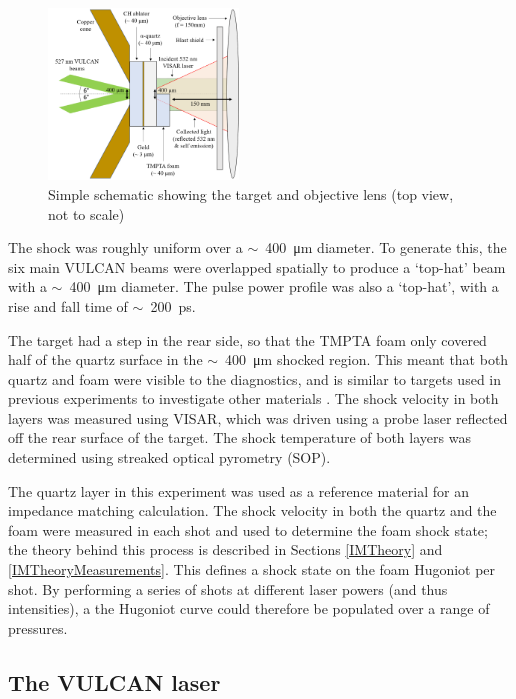\begin{figure}
\centering
\includegraphics[width=0.45\textwidth]{figures/Experiment/TargetSchematic.png}%
\caption{\label{fig:target} Simple schematic showing the target and objective lens (top view, not to scale)}
\end{figure}

The shock was roughly uniform over a $\sim$~400~\unit{\micro\meter} diameter. To generate this, the six main VULCAN beams were overlapped spatially to produce a `top-hat' beam with a $\sim$~400~\unit{\micro\meter} diameter. The pulse power profile was also a `top-hat', with a rise and fall time of $\sim$~200~\unit{\pico\second}. 

The target had a step in the rear side, so that the TMPTA foam only covered half of the quartz surface in the $\sim$~400~\unit{\micro\meter} shocked region. This meant that both quartz and foam were visible to the diagnostics, and is similar to targets used in previous experiments to investigate other materials \cite{Falk2014a, Falk2020}. The shock velocity in both layers was measured using VISAR, which was driven using a probe laser reflected off the rear surface of the target. The shock temperature of both layers was determined using streaked optical pyrometry (SOP).

The quartz layer in this experiment was used as a reference material for an impedance matching calculation. The shock velocity in both the quartz and the foam were measured in each shot and used to determine the foam shock state; the theory behind this process is described in Sections \ref{IMTheory} and \ref{IMTheoryMeasurements}. This defines a shock  state on the foam Hugoniot per shot. By performing a series of shots at different laser powers (and thus intensities), a the Hugoniot curve could therefore be populated over a range of pressures.

\subsection{The VULCAN laser}


